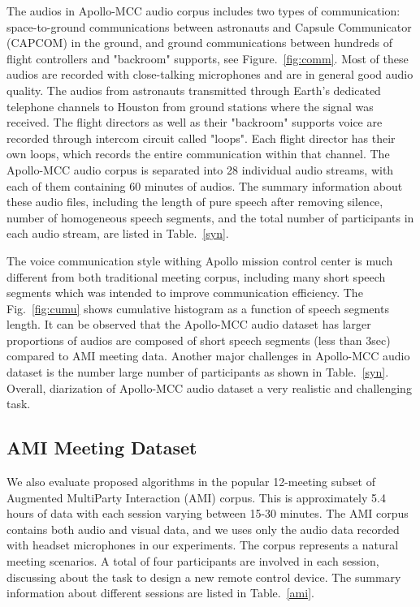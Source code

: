 \documentclass[journal]{IEEEtran}
\begin{document}
The audios in Apollo-MCC audio corpus includes two types of communication: space-to-ground communications between astronauts and Capsule Communicator (CAPCOM) in the ground, and ground communications between hundreds of flight controllers and "backroom" supports, see Figure.~\ref{fig:comm}. Most of these audios are recorded with close-talking microphones and are in general good audio quality. The audios from astronauts transmitted through Earth's dedicated telephone channels to Houston from ground stations where the signal was received. The flight directors as well as their "backroom" supports voice are recorded through intercom circuit called "loops". Each flight director has their own loops, which records the entire communication within that channel. The Apollo-MCC audio corpus is separated into 28 individual audio streams, with each of them containing 60 minutes of audios. The summary information about these audio files, including the length of pure speech after removing silence, number of homogeneous speech segments, and the total number of participants in each audio stream, are listed in Table.~\ref{syn}.

The voice communication style withing Apollo mission control center is much different from both traditional meeting corpus, including many short speech segments which was intended to improve communication efficiency. The Fig.~\ref{fig:cumu} shows cumulative histogram as a function of speech segments length. It can be observed that the Apollo-MCC audio dataset has larger proportions of audios are composed of short speech segments (less than 3sec) compared to AMI meeting data. Another major challenges in Apollo-MCC audio dataset is the number large number of participants as shown in Table.~\ref{syn}. Overall, diarization of Apollo-MCC audio dataset a very realistic and challenging task.

\subsection{AMI Meeting Dataset}
We also evaluate proposed algorithms in the popular 12-meeting subset of Augmented MultiParty Interaction (AMI) corpus. This is approximately 5.4 hours of data with each session varying between 15-30 minutes. The AMI corpus contains both audio and visual data, and we uses only the audio data recorded with headset microphones in our experiments. The corpus represents a natural meeting scenarios. A total of four participants are involved in each session, discussing about the task to design a new remote control device.  The summary information about different sessions are listed in Table.~\ref{ami}.
\end{document}
